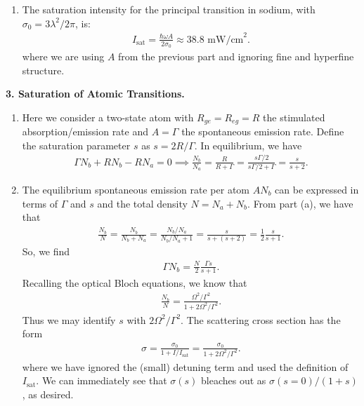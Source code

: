 \documentclass{article}
\theoremstyle{definition}
\newcommand{\f}[2]{\frac{#1}{#2}}
\begin{document}
\begin{enumerate}[label=(\alph*)]
	\item The saturation intensity for the principal transition in sodium, with $\sigma_0 = 3\lambda^2/2\pi$, is:
	\begin{align*}
	I_{\text{sat}} = \f{\hbar \omega A}{2\sigma_0}  \approx 38.8 \text{ mW/cm}^2.
	\end{align*}
	where we are using $A$ from the previous part and ignoring fine and hyperfine structure. 
	
\end{enumerate}


\textbf{3. Saturation of Atomic Transitions.}

\begin{enumerate}[label=(\alph*)]
	\item Here we consider a two-state atom with $R_{ge} = R_{eg} = R$ the stimulated absorption/emission rate and $A = \Gamma$ the spontaneous emission rate. Define the saturation parameter $s$ as $s = 2R/\Gamma$. In equilibrium, we have
	\begin{align*}
	\Gamma N_b + R N_b   - R N_a  = 0 \implies \f{N_b}{N_a} = \f{R}{R+\Gamma} = \f{s\Gamma/2}{s\Gamma/2 + \Gamma} =  \f{s}{s+2}.
	\end{align*}
	
	\item The equilibrium spontaneous emission rate per atom $A N_b$ can be expressed in terms of $\Gamma$ and $s$ and the total density $N = N_a + N_b$. From part (a), we have that
	\begin{align*}
	\f{N_b}{N} = \f{N_b}{N_b + N_a} = \f{N_b/N_a}{N_b/N_a + 1} = \f{s}{s + (s+2)} = \f{1}{2} \f{s}{s+1}.
	\end{align*}
	So, we find 
	\begin{align*}
	\Gamma N_b = \f{N}{2} \f{\Gamma s}{s+1}.
	\end{align*}
	Recalling the optical Bloch equations, we know that
	\begin{align*}
	\f{N_b}{N} = \f{\Omega^2/\Gamma^2}{1 +2\Omega^2/\Gamma^2}. 
	\end{align*}
	Thus we may identify $s$ with $2\Omega^2/\Gamma^2$. The scattering cross section has the form 
	\begin{align*}
	\sigma = \f{\sigma_0}{1 + I/I_\text{sat}} = \f{\sigma_0}{1 + 2\Omega^2/\Gamma^2}.
	\end{align*}
	where we have ignored the (small) detuning term and used the definition of $I_\text{sat}$. We can immediately see that $\sigma(s)$ bleaches out as $\sigma(s=0)/(1+s)$, as desired. 
	

\end{enumerate}
\end{document}
